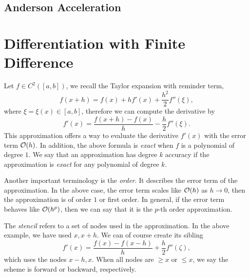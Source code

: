 \subsection{Anderson Acceleration}
\section{Differentiation with Finite Difference}
Let $f\in C^2([a, b])$, we recall the Taylor expansion with reminder term, 
\begin{equation}
    f(x + h) = f(x) + h f'(x) + \frac{h^2}{2} f''(\xi),
\end{equation}
where $\xi = \xi(x)\in [a, b]$, therefore we can compute the derivative by 
\begin{equation}
    f'(x)  = \frac{f(x + h) - f(x)}{h} - \frac{h}{2} f''(\xi).
\end{equation}
This approximation offers a way to evaluate the derivative $f'(x)$ with the error term $\mathcal O(h)$. In addition, the above formula is \emph{exact} when $f$ is a polynomial of degree $1$. We say that an approximation has degree $k$ accuracy if the approximation is \emph{exact} for any polynomial of degree $k$. 

Another important terminology is the \emph{order}. It describes the error term of the approximation. In the above case, the error term scales like $\mathcal O(h)$ as $h\to 0$, then the approximation is of order $1$ or first order. In general, if the error term behaves like $\mathcal O(h^p)$, then we can say that it is the $p$-th order approximation. 

The \emph{stencil} refers to a set of nodes used in the approximation. In the above example, we have used $x, x+h$. We can of course create its sibling
\begin{equation}
    f'(x) = \frac{f(x) - f(x - h)}{h} + \frac{h}{2} f''(\zeta),
\end{equation}
which uses the nodes $x-h, x$. When all nodes are $\ge x$ or $\le x$, we say the scheme is forward or backward, respectively.

